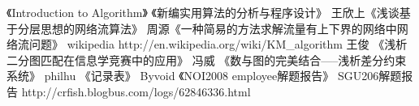 \begin{thebibliography}{99}
《Introduction to Algorithm》
 《新编实用算法的分析与程序设计》
王欣上《浅谈基于分层思想的网络流算法》
周源《一种简易的方法求解流量有上下界的网络中网络流问题》
 wikipedia http://en.wikipedia.org/wiki/KM\_algorithm
王俊 《浅析二分图匹配在信息学竞赛中的应用》
冯威 《数与图的完美结合-----浅析差分约束系统》
philhu 《记录表》
Byvoid 《NOI2008 employee解题报告》
SGU206解题报告 http://crfish.blogbus.com/logs/62846336.html
\end{thebibliography}
